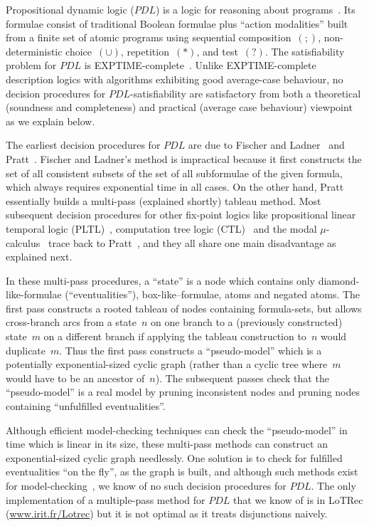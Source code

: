 \documentclass{entcs}
\newcommand{\psp}[2]{#1;#2}
\newcommand{\pup}[2]{#1\cup#2}
\newcommand{\prp}[1]{#1*}
\newcommand{\pip}[1]{#1?}
\newcommand{\pdl}{$PDL$}
\begin{document}
Propositional dynamic logic (\pdl{}) is a logic
for reasoning about programs~\cite{pratt-semantical,fischer-ladner-dynamic}.
Its formulae consist of traditional Boolean formulae
plus ``action modalities'' built from a finite set of atomic programs
using sequential composition~$(\psp{}{})$, non-deterministic choice~$(\pup{}{})$,
repetition~$(\prp{})$, and test~$(\pip{})$.
The satisfiability problem for \pdl{}
is EXPTIME-complete~\cite{pratt-near-optimal-reasoning-about-action}.
Unlike EXPTIME-complete description logics
with algorithms exhibiting good average-case behaviour,
no decision procedures for \pdl{}-satisfiability are satisfactory
from both a theoretical (soundness and completeness)
and practical (average case behaviour) viewpoint as we explain below.

The earliest decision procedures for \pdl{}
are due to Fischer and Ladner~\cite{fischer-ladner-dynamic}
and Pratt~\cite{pratt-near-optimal-reasoning-about-action}.
Fischer and Ladner's method is impractical
because it first constructs 
the set of all consistent subsets of the set of all subformulae of the given formula,
which always requires exponential time in all cases.
On the other hand, Pratt~\cite{pratt-near-optimal-reasoning-about-action}
essentially builds a multi-pass (explained shortly) tableau method.
Most subsequent decision procedures for other fix-point logics
like propositional linear temporal logic (PLTL)~\cite{wolper-expressive},
computation tree logic (CTL)~\cite{ben-ari-pnueli-manna-branching,emerson-halpern-decision}
and the modal $\mu$-calculus~\cite{kozen-parikh}
trace back to Pratt~\cite{pratt-near-optimal-reasoning-about-action},
and they all share one main disadvantage as explained next.

In these multi-pass procedures,
a ``state'' is a node
which contains only diamond-like-formulae (``eventualities''),
box-like--formulae, atoms and negated atoms.
The first pass constructs a rooted tableau of nodes containing formula-sets,
but allows cross-branch arcs from a state~$n$ on one branch
to a (previously constructed) state~$m$ on a different branch
if applying the tableau construction to~$n$ would duplicate~$m$.
Thus the first pass constructs a ``pseudo-model''
which is a potentially exponential-sized cyclic graph
(rather than a cyclic tree where~$m$ would have to be an ancestor of~$n$).
The subsequent passes check that the ``pseudo-model'' is a real model
by pruning inconsistent nodes and pruning nodes containing ``unfulfilled eventualities''.

Although efficient model-checking techniques
can check the ``pseudo-model'' in time which is linear in its size,
these multi-pass methods can construct an exponential-sized cyclic graph needlessly.
One solution is to check for fulfilled eventualities ``on the fly'',
as the graph is built,
and although such methods exist for
model-checking~\cite{cleaveland,bhat-cleaveland-on-the-fly-model-checking},
we know of no such decision procedures for \pdl{}. 
The only implementation of a multiple-pass method for \pdl{}
that we know of is in LoTRec (\url{www.irit.fr/Lotrec})
but it is not optimal as it treats disjunctions naively.
\end{document}
